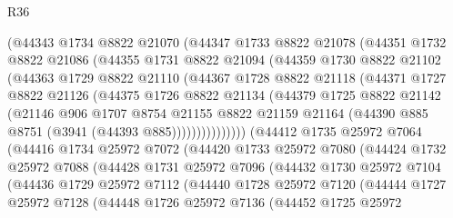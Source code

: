 \begin{lexlean}{R36}
\begin{coremodule}
          (@44343
            @1734
            @8822
            @21070
            (@44347
              @1733
              @8822
              @21078
              (@44351
                @1732
                @8822
                @21086
                (@44355
                  @1731
                  @8822
                  @21094
                  (@44359
                    @1730
                    @8822
                    @21102
                    (@44363
                      @1729
                      @8822
                      @21110
                      (@44367
                        @1728
                        @8822
                        @21118
                        (@44371
                          @1727
                          @8822
                          @21126
                          (@44375
                            @1726
                            @8822
                            @21134
                            (@44379
                              @1725
                              @8822
                              @21142
                              (@21146
                                @906
                                @1707
                                @8754
                                @21155
                                @8822
                                @21159
                                @21164
                                (@44390 @885 @8751 (@3941 (@44393 @885)))))))))))))))
        (@44412
          @1735
          @25972
          @7064
          (@44416
            @1734
            @25972
            @7072
            (@44420
              @1733
              @25972
              @7080
              (@44424
                @1732
                @25972
                @7088
                (@44428
                  @1731
                  @25972
                  @7096
                  (@44432
                    @1730
                    @25972
                    @7104
                    (@44436
                      @1729
                      @25972
                      @7112
                      (@44440
                        @1728
                        @25972
                        @7120
                        (@44444
                          @1727
                          @25972
                          @7128
                          (@44448
                            @1726
                            @25972
                            @7136
                            (@44452
                              @1725
                              @25972

\end{coremodule}
\end{lexlean}

